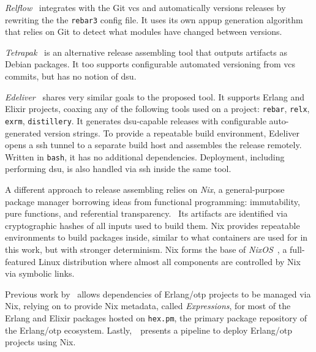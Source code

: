 \emph{Relflow}~\cite{relflow} integrates with the Git \acrshort{vcs} and automatically versions releases by rewriting the the \lstinline|rebar3| config file. It uses its own \acrshort{appup} generation algorithm that relies on Git to detect what modules have changed between versions.

\emph{Tetrapak}~\cite{tetrapak} is an alternative release assembling tool that outputs artifacts as Debian packages. It too supports configurable automated versioning from \acrshort{vcs} commits, but has no notion of \acrshort{dsu}.

\emph{Edeliver}~\cite{edeliver,talk:edeliver} shares very similar goals to the proposed tool. It supports Erlang and Elixir projects, coaxing any of the following tools used on a project: \lstinline|rebar|, \lstinline|relx|, \lstinline|exrm|, \lstinline|distillery|. It generates \acrshort{dsu}-capable releases with configurable auto-generated version strings. To provide a repeatable build environment, Edeliver opens a \acrfull{ssh} tunnel to a separate build host and assembles the release remotely. Written in \lstinline|bash|, it has no additional dependencies. Deployment, including performing \acrshort{dsu}, is also handled via \acrshort{ssh} inside the same tool.

A different approach to release assembling relies on \emph{Nix}, a general-purpose package manager borrowing ideas from functional programming: immutability, pure functions, and referential transparency.~\cite{nix1} Its artifacts are identified via cryptographic hashes of all inputs used to build them. Nix provides repeatable environments to build packages inside, similar to what containers are used for in this work, but with stronger determinism. Nix forms the base of \emph{NixOS}~\cite{nixos}, a full-featured Linux distribution where almost all components are controlled by Nix via symbolic links.

Previous work by~\cite{erlangnix} allows dependencies of Erlang/\acrshort{otp} projects to be managed via Nix, relying on \cite{hex2nix} to provide Nix metadata, called \emph{Expressions}, for most of the Erlang and Elixir packages hosted on \lstinline|hex.pm|, the primary package repository of the Erlang/\acrshort{otp} ecosystem. Lastly,~\cite{erlangnix2}~presents a pipeline to deploy Erlang/\acrshort{otp} projects using Nix.
